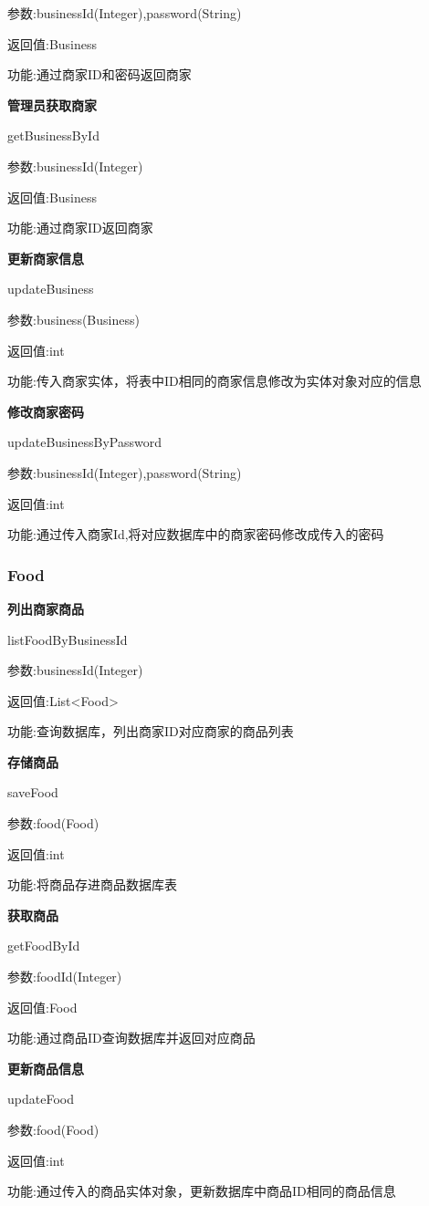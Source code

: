 参数:businessId(Integer),password(String)

返回值:Business

功能:通过商家ID和密码返回商家

\textbf{管理员获取商家}

getBusinessById

参数:businessId(Integer)

返回值:Business

功能:通过商家ID返回商家

\textbf{更新商家信息}

updateBusiness

参数:business(Business)

返回值:int

功能:传入商家实体，将表中ID相同的商家信息修改为实体对象对应的信息

\textbf{修改商家密码}

updateBusinessByPassword

参数:businessId(Integer),password(String)

返回值:int

功能:通过传入商家Id,将对应数据库中的商家密码修改成传入的密码

\subsubsection{Food}
\textbf{列出商家商品}

listFoodByBusinessId

参数:businessId(Integer)

返回值:List<Food>

功能:查询数据库，列出商家ID对应商家的商品列表

\textbf{存储商品}

saveFood

参数:food(Food)

返回值:int

功能:将商品存进商品数据库表

\textbf{获取商品}

getFoodById

参数:foodId(Integer)

返回值:Food

功能:通过商品ID查询数据库并返回对应商品

\textbf{更新商品信息}

updateFood

参数:food(Food)

返回值:int

功能:通过传入的商品实体对象，更新数据库中商品ID相同的商品信息

